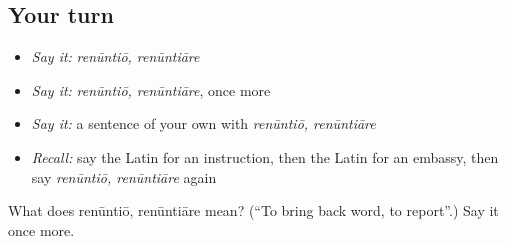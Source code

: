 \subsection*{Your turn}
\begin{itemize}
\raggedright
  \item \emph{Say it:} \emph{renūntiō, renūntiāre}
  \item \emph{Say it:} \emph{renūntiō, renūntiāre}, once more
  \item \emph{Say it:} a sentence of your own with \emph{renūntiō, renūntiāre}
  \item \emph{Recall:} say the Latin for an instruction, then the Latin for an embassy, then say \emph{renūntiō, renūntiāre} again
\end{itemize}

\begin{tcolorbox}[breakable,colback=teal!4,colframe=teal!35!black,title={Before you move on}]
What does renūntiō, renūntiāre mean? (\textquotedblleft{}To bring back word, to report\textquotedblright{}.) Say it once more.
\end{tcolorbox}
